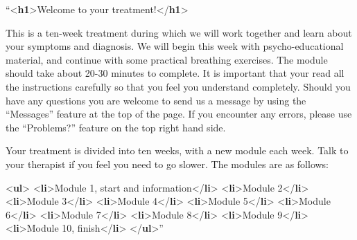 \documentclass[
]{book}
\newenvironment{Shaded}{\begin{snugshade}}{\end{snugshade}}
\newcommand{\DataTypeTok}[1]{\textcolor[rgb]{0.13,0.29,0.53}{#1}}
\newcommand{\KeywordTok}[1]{\textcolor[rgb]{0.13,0.29,0.53}{\textbf{#1}}}
\newcommand{\NormalTok}[1]{#1}
\begin{document}
\begin{Shaded}
\begin{Highlighting}[]
\NormalTok{“}\DataTypeTok{\textless{}}\KeywordTok{h1}\DataTypeTok{\textgreater{}}\NormalTok{Welcome to your treatment!}\DataTypeTok{\textless{}/}\KeywordTok{h1}\DataTypeTok{\textgreater{}}

\NormalTok{This is a ten{-}week treatment during which we will work together and learn}
\NormalTok{about your symptoms and diagnosis. We will begin this week with}
\NormalTok{psycho{-}educational material, and continue with some practical breathing}
\NormalTok{exercises. The module should take about 20{-}30 minutes to complete. It is}
\NormalTok{important that your read all the instructions carefully so that you feel}
\NormalTok{you understand completely. Should you have any questions you are welcome to}
\NormalTok{send us a message by using the “Messages” feature at the top of the page.}
\NormalTok{If you encounter any errors, please use the “Problems?” feature on the top}
\NormalTok{right hand side.}

\NormalTok{Your treatment is divided into ten weeks, with a new module each week. Talk}
\NormalTok{to your therapist if you feel you need to go slower. The modules are as}
\NormalTok{follows:}

\DataTypeTok{\textless{}}\KeywordTok{ul}\DataTypeTok{\textgreater{}}
  \DataTypeTok{\textless{}}\KeywordTok{li}\DataTypeTok{\textgreater{}}\NormalTok{Module 1, start and information}\DataTypeTok{\textless{}/}\KeywordTok{li}\DataTypeTok{\textgreater{}}
  \DataTypeTok{\textless{}}\KeywordTok{li}\DataTypeTok{\textgreater{}}\NormalTok{Module 2}\DataTypeTok{\textless{}/}\KeywordTok{li}\DataTypeTok{\textgreater{}}
  \DataTypeTok{\textless{}}\KeywordTok{li}\DataTypeTok{\textgreater{}}\NormalTok{Module 3}\DataTypeTok{\textless{}/}\KeywordTok{li}\DataTypeTok{\textgreater{}}
  \DataTypeTok{\textless{}}\KeywordTok{li}\DataTypeTok{\textgreater{}}\NormalTok{Module 4}\DataTypeTok{\textless{}/}\KeywordTok{li}\DataTypeTok{\textgreater{}}
  \DataTypeTok{\textless{}}\KeywordTok{li}\DataTypeTok{\textgreater{}}\NormalTok{Module 5}\DataTypeTok{\textless{}/}\KeywordTok{li}\DataTypeTok{\textgreater{}}
  \DataTypeTok{\textless{}}\KeywordTok{li}\DataTypeTok{\textgreater{}}\NormalTok{Module 6}\DataTypeTok{\textless{}/}\KeywordTok{li}\DataTypeTok{\textgreater{}}
  \DataTypeTok{\textless{}}\KeywordTok{li}\DataTypeTok{\textgreater{}}\NormalTok{Module 7}\DataTypeTok{\textless{}/}\KeywordTok{li}\DataTypeTok{\textgreater{}}
  \DataTypeTok{\textless{}}\KeywordTok{li}\DataTypeTok{\textgreater{}}\NormalTok{Module 8}\DataTypeTok{\textless{}/}\KeywordTok{li}\DataTypeTok{\textgreater{}}
  \DataTypeTok{\textless{}}\KeywordTok{li}\DataTypeTok{\textgreater{}}\NormalTok{Module 9}\DataTypeTok{\textless{}/}\KeywordTok{li}\DataTypeTok{\textgreater{}}
  \DataTypeTok{\textless{}}\KeywordTok{li}\DataTypeTok{\textgreater{}}\NormalTok{Module 10, finish}\DataTypeTok{\textless{}/}\KeywordTok{li}\DataTypeTok{\textgreater{}}
\DataTypeTok{\textless{}/}\KeywordTok{ul}\DataTypeTok{\textgreater{}}\NormalTok{”}
\end{Highlighting}
\end{Shaded}
\end{document}
